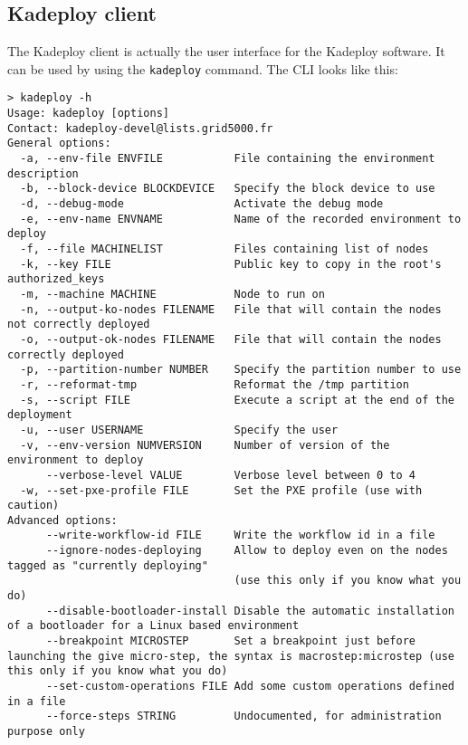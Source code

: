 \documentclass[a4wide,10pt,oneside]{book}
\begin{document}
\subsection{Kadeploy client}
The Kadeploy client is actually the user interface for the Kadeploy software. It can be used by using the \texttt{kadeploy} command. The CLI looks like this:
\begin{small}
\begin{verbatim}
> kadeploy -h
Usage: kadeploy [options]
Contact: kadeploy-devel@lists.grid5000.fr
General options:
  -a, --env-file ENVFILE           File containing the environment description
  -b, --block-device BLOCKDEVICE   Specify the block device to use
  -d, --debug-mode                 Activate the debug mode
  -e, --env-name ENVNAME           Name of the recorded environment to deploy
  -f, --file MACHINELIST           Files containing list of nodes
  -k, --key FILE                   Public key to copy in the root's authorized_keys
  -m, --machine MACHINE            Node to run on
  -n, --output-ko-nodes FILENAME   File that will contain the nodes not correctly deployed
  -o, --output-ok-nodes FILENAME   File that will contain the nodes correctly deployed
  -p, --partition-number NUMBER    Specify the partition number to use
  -r, --reformat-tmp               Reformat the /tmp partition
  -s, --script FILE                Execute a script at the end of the deployment
  -u, --user USERNAME              Specify the user
  -v, --env-version NUMVERSION     Number of version of the environment to deploy
      --verbose-level VALUE        Verbose level between 0 to 4
  -w, --set-pxe-profile FILE       Set the PXE profile (use with caution)
Advanced options:
      --write-workflow-id FILE     Write the workflow id in a file
      --ignore-nodes-deploying     Allow to deploy even on the nodes tagged as "currently deploying" 
                                   (use this only if you know what you do)
      --disable-bootloader-install Disable the automatic installation of a bootloader for a Linux based environment
      --breakpoint MICROSTEP       Set a breakpoint just before launching the give micro-step, the syntax is macrostep:microstep (use this only if you know what you do)
      --set-custom-operations FILE Add some custom operations defined in a file
      --force-steps STRING         Undocumented, for administration purpose only



\end{verbatim}
\end{small}
\end{document}
